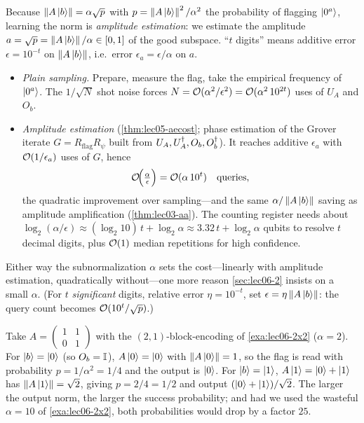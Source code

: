 \begin{remark}
\label{rem:lec06-normcost}
Because $\left\lVert A\ket b \right\rVert=\alpha\sqrt p$ with $p=\left\lVert A\ket b \right\rVert^2/\alpha^2$ the probability
of flagging $\ket{0^a}$, learning the norm is \emph{amplitude estimation}: we estimate the
amplitude $a=\sqrt p=\left\lVert A\ket b \right\rVert/\alpha\in[0,1]$ of the good subspace. ``$t$ digits''
means additive error $\epsilon=10^{-t}$ on $\left\lVert A\ket b \right\rVert$, i.e.\ error
$\epsilon_a=\epsilon/\alpha$ on $a$.
\begin{itemize}[leftmargin=1.4em,nosep]
  \item \emph{Plain sampling.} Prepare, measure the flag, take the empirical frequency of
        $\ket{0^a}$. The $1/\sqrt N$ shot noise forces
        $N=\mathcal{O}(\alpha^2/\epsilon^2)=\mathcal{O}(\alpha^2\,10^{2t})$ uses of $U_A$ and $O_b$.
  \item \emph{Amplitude estimation} (\cref{thm:lec05-aecost}; phase estimation of the
        Grover iterate $G=R_{\mathrm{flag}}R_{\psi}$ built from
        $U_A,U_A^{\dagger},O_b,O_b^{\dagger}$). It reaches additive $\epsilon_a$ with $\mathcal{O}(1/\epsilon_a)$
        uses of $G$, hence
        \[
          \mathcal{O}\!\Bigl(\tfrac{\alpha}{\epsilon}\Bigr)=\mathcal{O}(\alpha\,10^{t})
          \quad\text{queries},
        \]
        the quadratic improvement over sampling---and the same $\alpha/\left\lVert A\ket b \right\rVert$
        saving as amplitude amplification (\cref{thm:lec03-aa}). The counting register
        needs about $\log_2(\alpha/\epsilon)\approx(\log_2 10)\,t+\log_2\alpha\approx
        3.32\,t+\log_2\alpha$ qubits to resolve $t$ decimal digits, plus $\mathcal{O}(1)$ median
        repetitions for high confidence.
\end{itemize}
Either way the subnormalization $\alpha$ sets the cost---linearly with amplitude
estimation, quadratically without---one more reason \cref{sec:lec06-2} insists on a small
$\alpha$. (For $t$ \emph{significant} digits, relative error $\eta=10^{-t}$, set
$\epsilon=\eta\left\lVert A\ket b \right\rVert$: the query count becomes $\mathcal{O}(10^{t}/\sqrt p)$.)
\end{remark}

\begin{example}
\label{exa:lec06-matvec}
Take $A=\left(\begin{smallmatrix}1&1\\0&1\end{smallmatrix}\right)$ with the
$(2,1)$-block-encoding of \cref{exa:lec06-2x2} ($\alpha=2$). For $\ket{b}=\ket{0}$
(so $O_b=\mathbb{I}$), $A\ket{0}=\ket{0}$ with $\left\lVert A\ket{0} \right\rVert=1$, so the flag is read with
probability $p=1/\alpha^2=1/4$ and the output is $\ket{0}$. For $\ket{b}=\ket{1}$,
$A\ket{1}=\ket{0}+\ket{1}$ has $\left\lVert A\ket{1} \right\rVert=\sqrt2$, giving $p=2/4=1/2$ and output
$(\ket{0}+\ket{1})/\sqrt2$. The larger the output norm, the larger the success
probability; and had we used the wasteful $\alpha=10$ of \cref{exa:lec06-2x2}, both
probabilities would drop by a factor $25$.
\end{example}

